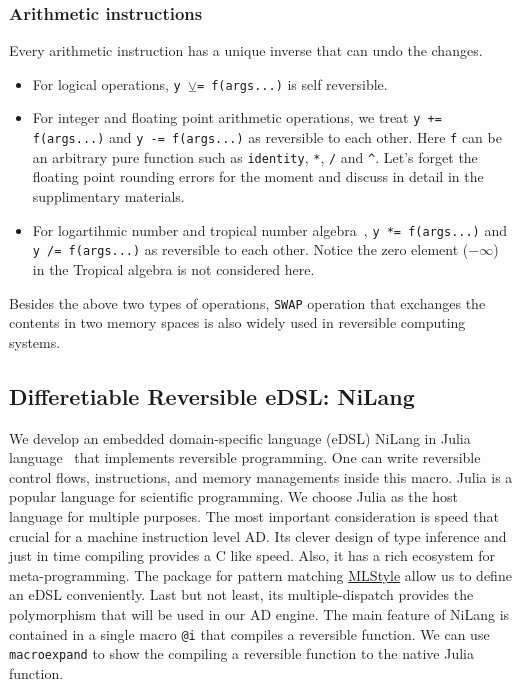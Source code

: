 \documentclass{article}
\newcommand{\<}{\langle}
\renewcommand{\>}{\rangle}
\theoremstyle{definition}\newtheorem{definition}{\textit{Definition}}
\begin{document}
\subsubsection{Arithmetic instructions}
Every arithmetic instruction has a unique inverse that can undo the changes.
\begin{itemize}
    \item For logical operations, \texttt{y $\veebar$= f(args...)} is self reversible.
    \item For integer and floating point arithmetic operations, we treat \texttt{y += f(args...)} and \texttt{y -= f(args...)} as reversible to each other. Here \texttt{f} can be an arbitrary pure function such as \texttt{identity}, \texttt{*}, \texttt{/} and \texttt{\^}. Let's forget the floating point rounding errors for the moment and discuss in detail in the supplimentary materials.
    \item For logartihmic number and tropical number algebra~\cite{Speyer2009}, \texttt{y *= f(args...)} and \texttt{y /= f(args...)} as reversible to each other. Notice the zero element ($-\infty$) in the Tropical algebra is not considered here.
\end{itemize}
Besides the above two types of operations, \texttt{SWAP} operation that exchanges the contents in two memory spaces is also widely used in reversible computing systems.

\subsection{Differetiable Reversible eDSL: NiLang}
    We develop an embedded domain-specific language (eDSL) NiLang in Julia language~\cite{Bezanson2012,Bezanson2017} that implements reversible programming. One can write reversible control flows, instructions, and memory managements inside this macro.
Julia is a popular language for scientific programming. We choose Julia as the host language for multiple purposes. The most important consideration is speed that crucial for a machine instruction level AD. Its clever design of type inference and just in time compiling provides a C like speed.
Also, it has a rich ecosystem for meta-programming. The package for pattern matching \href{https://github.com/thautwarm/MLStyle.jl}{MLStyle} allow us to define an eDSL conveniently. Last but not least, its multiple-dispatch provides the polymorphism that will be used in our AD engine.
The main feature of NiLang is contained in a single macro \texttt{@i} that compiles a reversible function.
We can use \texttt{macroexpand} to show the compiling a reversible function to the native Julia function.
\end{document}
